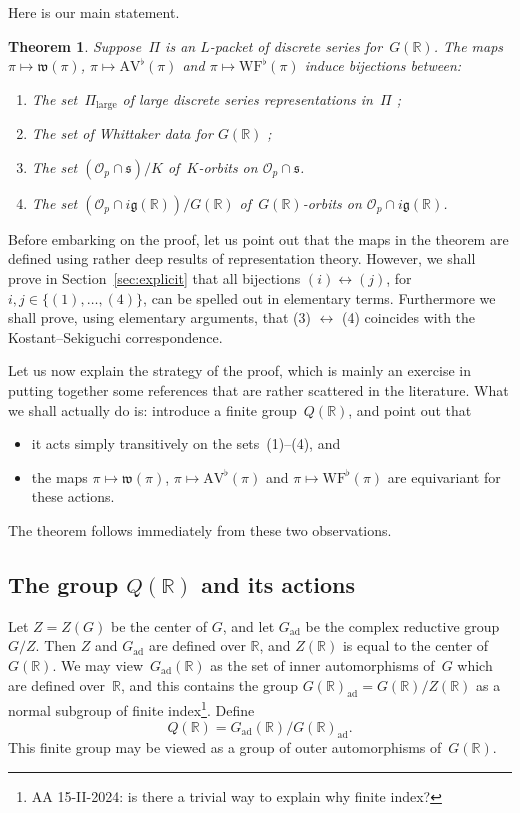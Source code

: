 \documentclass[10pt,leqno]{article}
\newtheorem{theorem}[equation]{Theorem}
\newcommand{\Gad}{G_\mathrm{ad}}
\renewcommand{\O}{\mathcal O}
\newcommand{\R}{\mathbb R}
\newcommand{\g}{\mathfrak g}
\newcommand{\s}{\mathfrak s}
\newcommand{\AV}{\mathrm{AV}}
\newcommand{\WF}{\mathrm{WF}}
\newcommand{\Op}{\O_p}
\begin{document}
Here is our main statement.

\begin{theorem} \label{th:main} Suppose~$\Pi$ is an $L$-packet of discrete series for~$G(\R)$. 
The maps $\pi \mapsto \mathfrak{w}(\pi)$, $\pi \mapsto \AV^\flat(\pi)$ and $\pi\mapsto \WF^\flat(\pi)$ induce bijections between:
\begin{enumerate}
\item[(1)] The set~$\Pi_{\mathrm{large}}$ of large discrete series representations in~$\Pi$ ;
\item[(2)] The set of Whittaker data for $G(\R)$ ;
\item[(3)] The set $(\Op \cap \s)/K$ of~$K$-orbits on $\mathcal{O}_p \cap \s$.
\item[(4)] The set $(\Op \cap i\g(\R))/G(\R)$ of~$G(\R)$-orbits on $\mathcal{O}_p \cap  i \g(\R)$.
\end{enumerate}
\end{theorem}

Before embarking on the proof, let us point out that the maps in the theorem are defined using rather deep results of representation theory. However, we shall prove in Section~\ref{sec:explicit} that all bijections $(i) \leftrightarrow (j)$, for $i,j \in \{(1), \dots, (4)\}$, can be spelled out in elementary terms. Furthermore we shall prove, using elementary arguments, that (3) $\leftrightarrow$ (4) coincides with the Kostant--Sekiguchi correspondence.  



Let us now explain the strategy of the proof, which is mainly an exercise in putting together some references that are rather scattered in the literature. What we shall actually do is: introduce a finite group~$Q(\R)$, and point out that 
\begin{itemize}
\item[(i)] it acts simply transitively on the sets~(1)--(4), and 
\item[(ii)] the maps $\pi \mapsto \mathfrak{w}(\pi)$, $\pi \mapsto \AV^\flat(\pi)$ and $\pi\mapsto \WF^\flat(\pi)$  are equivariant for these actions.
\end{itemize}
The theorem follows immediately from these two observations. 

\subsection{The group $Q(\R)$ and its actions} Let $Z=Z(G)$ be the center of $G$, and let $\Gad$ be the complex reductive group~$G/Z$.
Then $Z$ and $\Gad$ are defined over $\R$, and $Z(\R)$ is equal to the center of $G(\R)$. We may view~$\Gad(\R)$ as the set of inner automorphisms of~$G$ which are defined over~$\R$, and this contains the group $G(\R)_{\mathrm{ad}}=G(\R)/Z(\R)$ as a normal subgroup of finite index\footnote{AA 15-II-2024: is there a trivial way to explain why finite index?}.
Define 
$$
Q(\R)=\Gad(\R)/G(\R)_{\mathrm{ad}}.
$$
This finite group may be viewed as a group of outer automorphisms of~$G(\R)$. 
\end{document}
